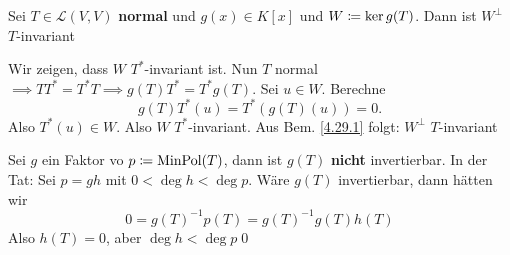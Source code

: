 \begin{sublemma}
	Sei $ T \in \mathcal{L} (V, V) $ \textbf{normal} und $ g(x) \in K[x] $ und $ W \coloneqq \operatorname{ker} g(T) $.
	Dann ist $ W^\perp $ $ T $-invariant
\end{sublemma}
\begin{subproof*}
	Wir zeigen, dass $ W $ $ T^* $-invariant ist.
	Nun $ T $ normal $ \implies T T^* = T^*T \implies g(T)T^* = T^* g(T) $.
	Sei $ u \in W $. Berechne
	\[
		g(T) T^* (u) = T^* (g(T)(u)) = 0.
	\]
	Also $ T^*(u) \in W $.
	Also $ W $ $ T^* $-invariant.
	Aus Bem. \ref{4.29.1} folgt: $ W^\perp $ $ T $-invariant
\end{subproof*}

\begin{subnote}
	Sei $ g $ ein Faktor vo $ p \coloneqq \operatorname{Min Pol} (T) $, dann ist $ g(T) $ \textbf{nicht} invertierbar.
	In der Tat:
	Sei $ p = gh $ mit $ 0 < \deg h < \deg p $.
	Wäre $ g(T) $ invertierbar, dann hätten wir
	\[
		0 = g(T)^{-1} p(T) = g(T)^{-1} g(T) h(T)
	\]
	Also $ h(T) = 0 $, aber $ \deg h < \deg p $\qed
\end{subnote}

